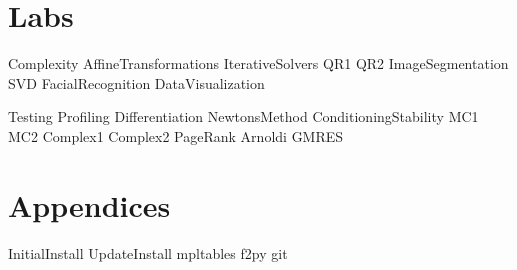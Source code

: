 \documentclass[nociteref]{SIAM-GH-book}
\begin{document}
\part{Labs} %
{Complexity}
{AffineTransformations}
{IterativeSolvers}
{QR1}
{QR2}
{ImageSegmentation}
{SVD}
{FacialRecognition}
{DataVisualization}

{Testing}
{Profiling}
{Differentiation}
{NewtonsMethod} %
{ConditioningStability}
{MC1}
{MC2}
{Complex1}
{Complex2}
{PageRank}
{Arnoldi}
{GMRES}


\part{Appendices} %
\begin{appendices}
{InitialInstall}
{UpdateInstall}
{mpltables}
{f2py}
{git}
\end{appendices}
\end{document}
